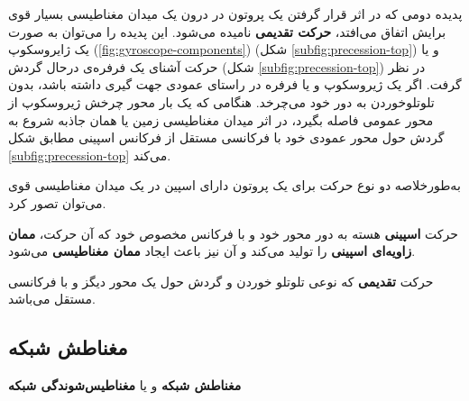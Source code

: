  
پدیده دومی که در اثر قرار گرفتن یک پروتون در درون یک میدان مغناطیسی بسیار قوی برایش اتفاق می‌افتد، \textbf{حرکت تقدیمی }نامیده می‌شود. این پدیده را می‌توان به صورت یک ژایروسکوپ 
(\ref{fig:gyroscope-components})
(شکل \ref{subfig:precession-top}) و یا حرکت آشنای یک فرفره‌ی درحال گردش (شکل \ref{subfig:precession-top})
در نظر گرفت. اگر یک ژیروسکوپ و یا فرفره در راستای عمودی جهت گیری داشته باشد، بدون تلوتلو‌خوردن
به دور خود می‌چرخد. هنگامی که یک بار محور چرخش ژیروسکوپ از محور عمومی فاصله بگیرد، در اثر میدان مغناطیسی زمین یا همان جاذبه
 شروع به گردش حول محور عمودی خود با فرکانسی مستقل از فرکانس اسپینی مطابق شکل \ref{subfig:precession-top}
می‌کند. 

به‌طور‌خلاصه دو نوع حرکت برای یک پروتون دارای اسپین در یک میدان مغناطیسی قوی می‌توان تصور کرد.

\begin{alphabetlist}
	\item
	حرکت \textbf{اسپینی} هسته به دور محور خود و با فرکانس مخصوص خود که آن حرکت، \textbf{ممان زاویه‌ای اسپینی }را تولید می‌کند و آن نیز باعث ایجاد \textbf{ممان مغناطیسی }می‌شود.
	\item
	حرکت \textbf{تقدیمی} که نوعی تلوتلو خوردن و  گردش حول یک محور دیگز و با فرکانسی مستقل می‌باشد.
\end{alphabetlist}


\subsection{مغناطش شبکه}
\textbf{مغناطش شبکه} و یا \textbf{مغناطیس‌شوندگی شبکه} 



\begin{figure}
	\centering
	\caption{}
	\label{fig:net-mag}
\end{figure}

